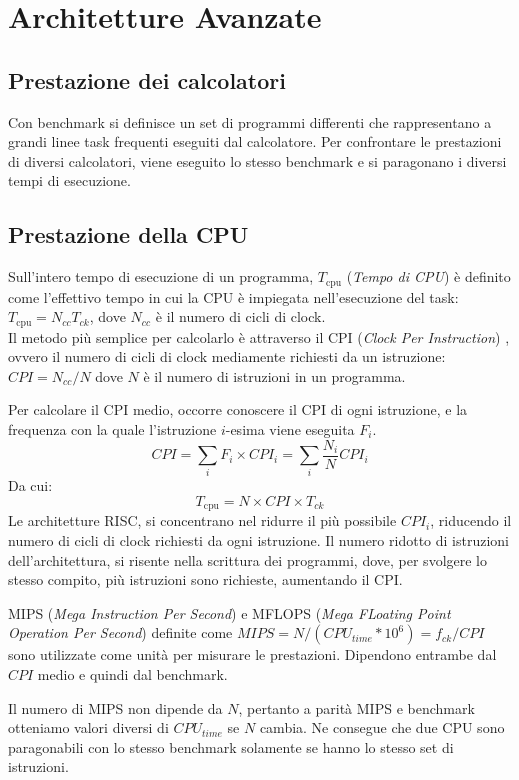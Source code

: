 \documentclass[../template]{subfiles}
\begin{document}
\section{Architetture Avanzate}
\subsection{Prestazione dei calcolatori}
Con benchmark si definisce un set di programmi differenti che rappresentano a grandi linee task frequenti eseguiti dal calcolatore.
Per confrontare le prestazioni di diversi calcolatori, viene eseguito lo stesso benchmark e si paragonano i diversi tempi di esecuzione.

\def\tcpu{T_\text{cpu}}

\subsection{Prestazione della CPU}
Sull'intero tempo di esecuzione di un programma, $\tcpu$ (\textit{Tempo di CPU}) è definito come l'effettivo tempo in cui la CPU è impiegata nell'esecuzione del task: $\tcpu = N_{cc} T_{ck}$, dove $N_{cc}$ è il numero di cicli di clock.
\\
Il metodo più semplice per calcolarlo è attraverso il CPI (\textit{Clock Per Instruction}) , ovvero il numero di cicli di clock mediamente richiesti da un istruzione: $\mathit{CPI} = N_{cc}/N$ dove $N$ è il numero di istruzioni in un programma.

Per calcolare il CPI medio, occorre conoscere il CPI di ogni istruzione, e la frequenza con la quale l'istruzione
$i$-esima viene eseguita $F_i$.
\[
    \mathit{CPI} = \sum_i F_i \times \mathit{CPI}_i = \sum_i \frac{N_i}{N} \mathit{CPI}_i
\]
Da cui:
\[
    \tcpu = N \times \mathit{CPI} \times T_{ck}
\]
Le architetture RISC, si concentrano nel ridurre il più possibile $\mathit{CPI}_i$, riducendo il numero di cicli di clock richiesti da ogni istruzione.
Il numero ridotto di istruzioni dell'architettura, si risente nella scrittura dei programmi, dove, per svolgere lo stesso compito, più istruzioni sono richieste, aumentando il CPI.

MIPS (\textit{Mega Instruction Per Second}) e MFLOPS (\textit{Mega FLoating Point Operation Per Second}) definite come
$\mathit{MIPS} = N / (\mathit{CPU}_\mathit{time} * 10^6) = f_\mathit{ck} / \mathit{CPI}$ sono utilizzate come unità per misurare le prestazioni.
Dipendono entrambe dal $\mathit{CPI}$ medio e quindi dal benchmark.

Il numero di MIPS non dipende da $N$, pertanto a parità MIPS e benchmark otteniamo valori diversi di
$\mathit{CPU}_\mathit{time}$ se $N$ cambia.
Ne consegue che due CPU sono paragonabili con lo stesso benchmark solamente se hanno lo stesso set di istruzioni.
\end{document}
